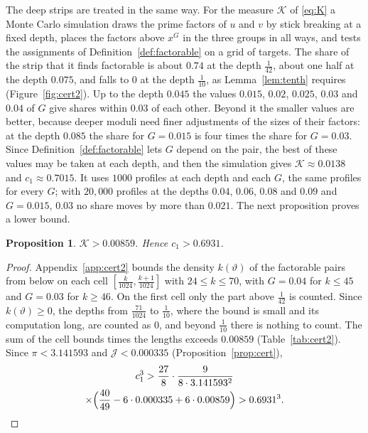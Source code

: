 \documentclass[aps,prd,twocolumn,superscriptaddress,nofootinbib,longbibliography,floatfix,showkeys,nobalancelastpage,amsmath,amssymb,10pt]{revtex4-2}
\theoremstyle{plain}
\newtheorem{proposition}[theorem]{Proposition}
\theoremstyle{definition}
\theoremstyle{plain}
\newcommand{\Jc}{\mathcal{J}}
\newcommand{\Kc}{\mathcal{K}}
\newcommand{\Kbound}{0.00859}
\newcommand{\cbound}{0.6931}
\newcommand{\Kmc}{0.0138}
\newcommand{\cmc}{0.7015}
\begin{document}
The deep strips are treated in the same way. For the measure $\Kc$ of \eqref{eq:K} a Monte Carlo simulation draws the prime factors of $u$ and $v$ by stick breaking at a fixed depth, places the factors above $x^G$ in the three groups in all ways, and tests the assignments of Definition~\ref{def:factorable} on a grid of targets. The share of the strip that it finds factorable is about $0.74$ at the depth $\frac1{42}$, about one half at the depth $0.075$, and falls to $0$ at the depth $\frac1{10}$, as Lemma~\ref{lem:tenth} requires (Figure~\ref{fig:cert2}). Up to the depth $0.045$ the values $0.015$, $0.02$, $0.025$, $0.03$ and $0.04$ of $G$ give shares within $0.03$ of each other. Beyond it the smaller values are better, because deeper moduli need finer adjustments of the sizes of their factors: at the depth $0.085$ the share for $G=0.015$ is four times the share for $G=0.03$. Since Definition~\ref{def:factorable} lets $G$ depend on the pair, the best of these values may be taken at each depth, and then the simulation gives $\Kc\approx\Kmc$ and $c_1\approx\cmc$. It uses $1000$ profiles at each depth and each $G$, the same profiles for every $G$; with $20{,}000$ profiles at the depths $0.04$, $0.06$, $0.08$ and $0.09$ and $G=0.015$, $0.03$ no share moves by more than $0.021$. The next proposition proves a lower bound.

\begin{proposition}\label{prop:cert2}
$\Kc>\Kbound$. Hence $c_1>\cbound$.
\end{proposition}

\begin{proof}
Appendix~\ref{app:cert2} bounds the density $k(\vartheta)$ of the factorable pairs from below on each cell $[\frac k{1024},\frac{k+1}{1024}]$ with $24\le k\le70$, with $G=0.04$ for $k\le45$ and $G=0.03$ for $k\ge46$. On the first cell only the part above $\frac1{42}$ is counted. Since $k(\vartheta)\ge0$, the depths from $\frac{71}{1024}$ to $\frac1{10}$, where the bound is small and its computation long, are counted as $0$, and beyond $\frac1{10}$ there is nothing to count. The sum of the cell bounds times the lengths exceeds $\Kbound$ (Table~\ref{tab:cert2}). Since $\pi<3.141593$ and $\Jc<0.000335$ (Proposition~\ref{prop:cert}),
\begin{multline*}
c_1^3>\frac{27}8\cdot\frac9{8\cdot3.141593^2}\\
\times\Bigl(\frac{40}{49}-6\cdot0.000335+6\cdot\Kbound\Bigr)>\cbound^3.\qedhere
\end{multline*}
\end{proof}
\end{document}
